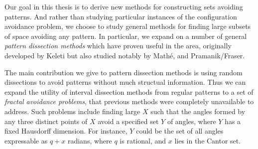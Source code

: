 Our goal in this thesis is to derive new methods for constructing sets avoiding patterns. And rather than studying particular instances of the configuration avoidance problem, we choose to study general methods for finding large subsets of space avoiding any pattern. In particular, we expand on a number of general {\it pattern dissection methods} which have proven useful in the area, originally developed by Keleti but also studied notably by Math\'{e}, and Pramanik/Fraser.

The main contribution we give to pattern dissection methods is using random dissections to avoid patterns without much structual information. Thus we can expand the utility of interval dissection methods from regular patterns to a set of {\it fractal avoidance problems}, that previous methods were completely unavailable to address. Such problems include finding large $X$ such that the angles formed by any three distinct points of $X$ avoid a specified set $Y$ of angles, where $Y$ has a fixed Hausdorff dimension. For instance, $Y$ could be the set of all angles expressable as $q + x$ radians, where $q$ is rational, and $x$ lies in the Cantor set.

\endinput

Any text after an \endinput is ignored.
You could put scraps here or things in progress.